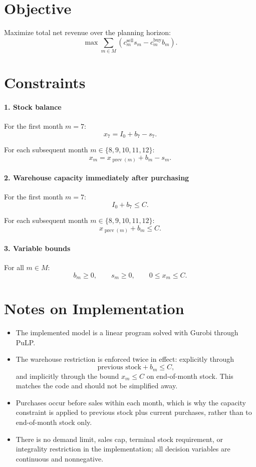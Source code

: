 \section*{Objective}

Maximize total net revenue over the planning horizon:
\[
\max \sum_{m \in M} \left(c_m^{\text{sell}} s_m - c_m^{\text{buy}} b_m\right).
\]

\section*{Constraints}

\paragraph{1. Stock balance}
For the first month $m=7$:
\[
x_7 = I_0 + b_7 - s_7.
\]

For each subsequent month $m \in \{8,9,10,11,12\}$:
\[
x_m = x_{\operatorname{prev}(m)} + b_m - s_m.
\]

\paragraph{2. Warehouse capacity immediately after purchasing}
For the first month $m=7$:
\[
I_0 + b_7 \le C.
\]

For each subsequent month $m \in \{8,9,10,11,12\}$:
\[
x_{\operatorname{prev}(m)} + b_m \le C.
\]

\paragraph{3. Variable bounds}
For all $m \in M$:
\[
b_m \ge 0,\qquad s_m \ge 0,\qquad 0 \le x_m \le C.
\]

\section*{Notes on Implementation}

\begin{itemize}
    \item The implemented model is a linear program solved with Gurobi through PuLP.
    \item The warehouse restriction is enforced twice in effect: explicitly through
    \[
    \text{previous stock} + b_m \le C,
    \]
    and implicitly through the bound $x_m \le C$ on end-of-month stock. This matches the code and should not be simplified away.
    \item Purchases occur before sales within each month, which is why the capacity constraint is applied to previous stock plus current purchases, rather than to end-of-month stock only.
    \item There is no demand limit, sales cap, terminal stock requirement, or integrality restriction in the implementation; all decision variables are continuous and nonnegative.
\end{itemize}
